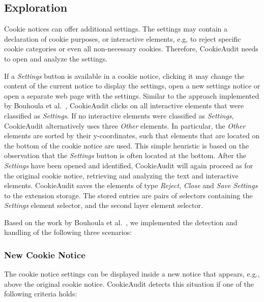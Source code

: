 \subsection{Exploration}
Cookie notices can offer additional settings.
The settings may contain a declaration of cookie purposes, or interactive elements, e.g, to reject specific cookie categories or even all non-necessary cookies.
Therefore, CookieAudit needs to open and analyze the settings.

If a \emph{Settings} button is available in a cookie notice, clicking it may change the content of the current notice to display the settings, open a new settings notice or open a separate web page with the settings.
Similar to the approach implemented by Bouhoula et al.~\cite{bouhoula2023automated}, CookieAudit clicks on all interactive elements that were classified as \emph{Settings}.
If no interactive elements were classified as \emph{Settings}, CookieAudit alternatively uses three \emph{Other} elements. 
In particular, the \emph{Other} elements are sorted by their y-coordinates, such that elements that are located on the bottom of the cookie notice are used.
This simple heuristic is based on the observation that the \emph{Settings} button is often located at the bottom.
After the \emph{Settings} have been opened and identified, CookieAudit will again proceed as for the original cookie notice, retrieving and analyzing the text and interactive elements.
CookieAudit saves the elements of type \emph{Reject}, \emph{Close} and \emph{Save Settings} to the extension storage. The stored entries are pairs of selectors containing the \emph{Settings} element selector, and the second layer element selector.

Based on the work by Bouhoula et al.~\cite{bouhoula2023automated}, we implemented the detection and handling of the following three scenarios:

\subsubsection{New Cookie Notice}
The cookie notice settings can be displayed inside a new notice that appears, e.g., above the original cookie notice. 
CookieAudit detects this situation if one of the following criteria holds:

